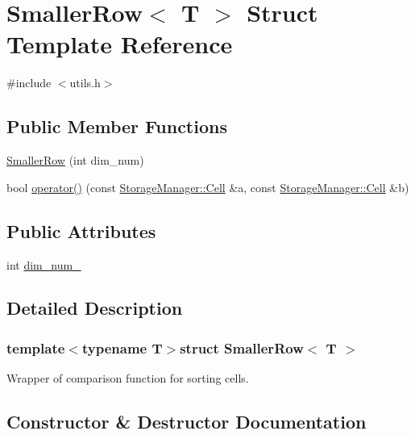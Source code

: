 \hypertarget{structSmallerRow}{}\section{Smaller\+Row$<$ T $>$ Struct Template Reference}
\label{structSmallerRow}


{\ttfamily \#include $<$utils.\+h$>$}

\subsection*{Public Member Functions}
\begin{DoxyCompactItemize}
\item 
\hyperlink{structSmallerRow_a29ec9f12081282f4ff5f1f311a48d87c}{Smaller\+Row} (int dim\+\_\+num)
\item 
bool \hyperlink{structSmallerRow_a3d98a739ee2dae93de61613cd95e558b}{operator()} (const \hyperlink{structStorageManager_1_1Cell}{Storage\+Manager\+::\+Cell} \&a, const \hyperlink{structStorageManager_1_1Cell}{Storage\+Manager\+::\+Cell} \&b)
\end{DoxyCompactItemize}
\subsection*{Public Attributes}
\begin{DoxyCompactItemize}
\item 
int \hyperlink{structSmallerRow_aa3a7a1554cc7f9cf240bc6f8f28ade86}{dim\+\_\+num\+\_\+}
\end{DoxyCompactItemize}


\subsection{Detailed Description}
\subsubsection*{template$<$typename T$>$struct Smaller\+Row$<$ T $>$}

Wrapper of comparison function for sorting cells. 

\subsection{Constructor \& Destructor Documentation}
\hypertarget{structSmallerRow_a29ec9f12081282f4ff5f1f311a48d87c}{}

